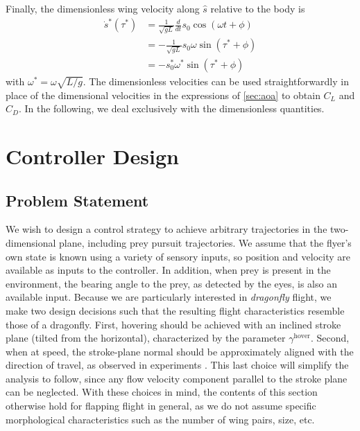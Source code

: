 \documentclass[11pt,letterpaper]{article}
\begin{document}
Finally, the dimensionless wing velocity along $\hat{s}$ relative to the body is
\begin{align}
    \dot{s}^*(\tau^*) &= \frac{1}{\sqrt{gL}} \frac{d}{dt} s_0 \cos(\omega t + \phi) \nonumber \\
                      &= -\frac{1}{\sqrt{gL}} s_0 \omega \sin(\tau^* + \phi) \nonumber \\
                      &= - s_0^* \omega^* \sin(\tau^* + \phi)
\end{align}
with $\omega^* = \omega \sqrt{L/g}$. The dimensionless
velocities can be used straightforwardly in place
of the dimensional velocities in the expressions of \autoref{sec:aoa}
to obtain $C_L$ and $C_D$. In the following,
we deal exclusively with the dimensionless quantities.

\section{Controller Design}\label{sec:design}

\subsection{Problem Statement}\label{sec:problem-statement}

We wish to design a control strategy to achieve
arbitrary trajectories in the two-dimensional plane,
including prey pursuit trajectories. We assume that
the flyer's own state is known using a variety
of sensory inputs, so position and velocity are
available as inputs to the controller. In addition,
when prey is present in the environment,
the bearing angle to the prey, as detected by the eyes,
is also an available input. Because we are
particularly interested in \emph{dragonfly}
flight, we make two design decisions such that the resulting
flight characteristics resemble those of a dragonfly.
First, hovering should be achieved with an inclined stroke
plane (tilted from the horizontal), characterized by
the parameter $\gamma^\text{hover}$. Second, when at speed, the
stroke-plane normal should be approximately aligned
with the direction of travel, as observed in experiments
\cite{azuma1985}. This last choice will simplify
the analysis to follow, since any flow velocity
component parallel to the stroke plane can be neglected.
With these choices in mind, the contents of this section
otherwise hold for flapping flight in general, as we
do not assume specific morphological characteristics
such as the number of wing pairs, size, etc.
\end{document}
